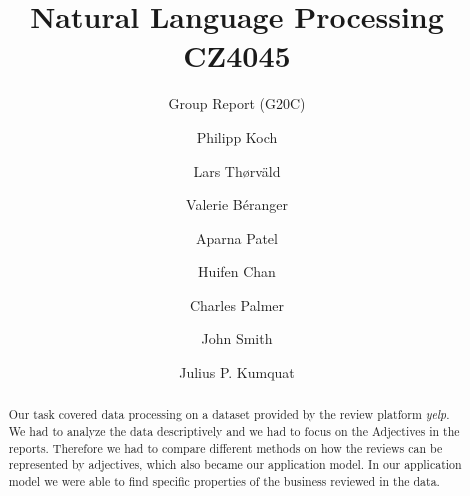 \documentclass[sigchi]{acmart}
\begin{document}
	
	\title{Natural Language Processing CZ4045}
	\subtitle{Group Report (G20C)}
	
	\author{Philipp Koch}
	
	\author{Lars Th{\o}rv{\"a}ld}
	
	\author{Valerie B\'eranger}
	
	\author{Aparna Patel}
	
	\author{Huifen Chan}
	
	\author{Charles Palmer}
	
	\author{John Smith}
	
	\author{Julius P. Kumquat}
	
	
	\begin{abstract}
		Our task covered data processing on a dataset provided by the review platform \textit{yelp}. We had to analyze the data
		descriptively and we had to focus on the Adjectives in the reports. Therefore we had to compare different methods on how the reviews can be represented by adjectives, which also became our application model. In our application model we were able to find specific properties of the business reviewed in the data.
	\end{abstract}
	
\end{document}
